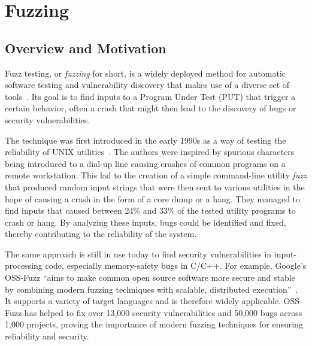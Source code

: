 
\section{Fuzzing}\label{sec:fuzzing}


\subsection{Overview and Motivation}\label{sec:fuzzing-overview}

Fuzz testing, or \textit{fuzzing} for short, is a widely deployed method for automatic
software testing and vulnerability discovery that makes use of a diverse set of
tools~\cite{manes_art_2019}.
Its goal is to find inputs to a Program Under Test (PUT) that trigger a certain
behavior, often a crash that might then lead to the discovery of bugs or security
vulnerabilities.

The technique was first introduced in the early 1990s as a way of testing the
reliability of UNIX utilities~\cite{miller_empirical_1990}.
The authors were inspired by spurious characters being introduced to a dial-up
line causing crashes of common programs on a remote workstation.
This lad to the creation of a simple command-line utility \emph{fuzz} that produced
random input strings that were then sent to various utilities in the hope of causing
a crash in the form of a core dump or a hang.
They managed to find inputs that caused between 24\% and 33\% of the tested
utility programs to crash or hang.
By analyzing these inputs, bugs could be identified and fixed, thereby
contributing to the reliability of the system.

The same approach is still in use today to find security vulnerabilities in
input-processing code, especially memory-safety bugs in C/C++.
For example, Google's OSS-Fuzz
\enquote{aims to make common open source software more secure and stable by combining
modern fuzzing techniques with scalable, distributed execution}~\cite{arya_oss-fuzz_nodate}.
It supports a variety of target languages and is therefore widely applicable.
OSS-Fuzz has helped to fix over 13,000 security vulnerabilities and 50,000 bugs across
1,000 projects, proving the importance of modern fuzzing techniques for ensuring reliability and security.\\

